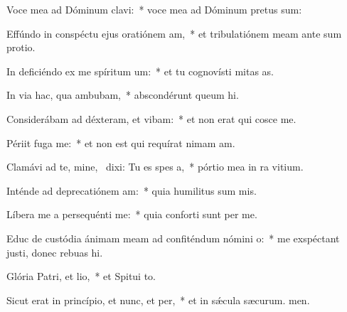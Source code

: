 \item Voce mea ad Dóminum clavi:~* voce mea ad Dóminum pretus sum:
\item Effúndo in conspéctu ejus oratiónem am,~* et tribulatiónem meam ante sum protio.
\item In deficiéndo ex me spíritum um:~* et tu cognovísti mitas as.
\item In via hac, qua ambubam,~* abscondérunt queum hi.
\item Considerábam ad déxteram, et vibam:~* et non erat qui cosce me.
\item Périit fuga  me:~* et non est qui requírat nimam am.
\item Clamávi ad te, mine,~\pscross{} dixi: Tu es spes a,~* pórtio mea in ra vitium.
\item Inténde ad deprecatiónem am:~* quia humilitus sum mis.
\item Líbera me a persequénti me:~* quia conforti sunt per me.
\item Educ de custódia ánimam meam ad confiténdum nómini o:~* me exspéctant justi, donec rebuas hi.
\item Glória Patri, et lio,~* et Spitui to.
\item Sicut erat in princípio, et nunc, et per,~* et in sǽcula sæcurum. men.
